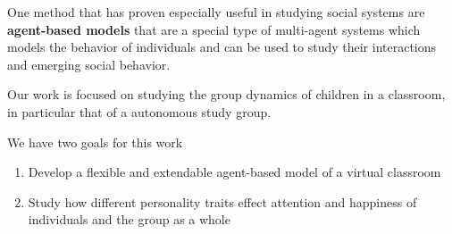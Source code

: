 \bb

One method that has proven especially useful in studying social systems are
\textbf{agent-based models}\cite{Jackson2017} that are a special type of multi-agent systems
which models the behavior of individuals and can be used to study their interactions
and emerging social behavior.

\bb
Our work is focused on studying the group dynamics of children in a classroom, in
particular that of a autonomous study group.

\bb

We have two goals for this work
\begin{enumerate}
    \item Develop a flexible and extendable agent-based model of a virtual classroom
    \item Study how different personality traits effect attention and happiness of individuals and the group as a whole
\end{enumerate}
